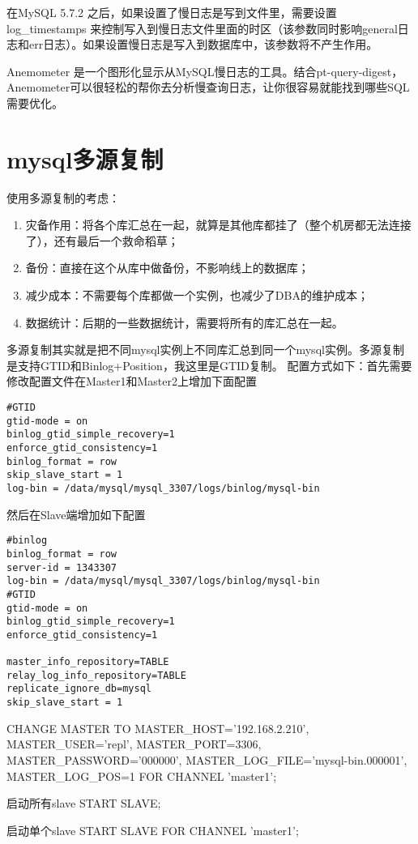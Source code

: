 在MySQL 5.7.2 之后，如果设置了慢日志是写到文件里，需要设置log_timestamps 来控制写入到慢日志文件里面的时区（该参数同时影响general日志和err日志）。如果设置慢日志是写入到数据库中，该参数将不产生作用。

Anemometer 是一个图形化显示从MySQL慢日志的工具。结合pt-query-digest，Anemometer可以很轻松的帮你去分析慢查询日志，让你很容易就能找到哪些SQL需要优化。

\section{mysql多源复制}

使用多源复制的考虑：
\begin{enumerate}
\item 灾备作用：将各个库汇总在一起，就算是其他库都挂了（整个机房都无法连接了），还有最后一个救命稻草；
\item 备份：直接在这个从库中做备份，不影响线上的数据库；
\item 减少成本：不需要每个库都做一个实例，也减少了DBA的维护成本；
\item 数据统计：后期的一些数据统计，需要将所有的库汇总在一起。
\end{enumerate}

多源复制其实就是把不同mysql实例上不同库汇总到同一个mysql实例。多源复制是支持GTID和Binlog+Position，我这里是GTID复制。
配置方式如下：首先需要修改配置文件在Master1和Master2上增加下面配置
 \begin{lstlisting}
#GTID
gtid-mode = on
binlog_gtid_simple_recovery=1
enforce_gtid_consistency=1
binlog_format = row
skip_slave_start = 1
log-bin = /data/mysql/mysql_3307/logs/binlog/mysql-bin
  \end{lstlisting}
然后在Slave端增加如下配置
 \begin{lstlisting}
#binlog
binlog_format = row
server-id = 1343307
log-bin = /data/mysql/mysql_3307/logs/binlog/mysql-bin
#GTID
gtid-mode = on
binlog_gtid_simple_recovery=1
enforce_gtid_consistency=1

master_info_repository=TABLE
relay_log_info_repository=TABLE
replicate_ignore_db=mysql
skip_slave_start = 1
 \end{lstlisting}
 
CHANGE MASTER TO MASTER_HOST='192.168.2.210',
MASTER_USER='repl',
MASTER_PORT=3306,
MASTER_PASSWORD='000000',
MASTER_LOG_FILE='mysql-bin.000001',
MASTER_LOG_POS=1 FOR CHANNEL 'master1';

启动所有slave
START SLAVE;

启动单个slave
START SLAVE FOR CHANNEL 'master1';

